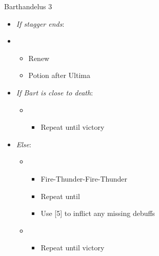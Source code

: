 \begin{battle}{Barthandelus 3}
\begin{multicols}{2}
\begin{itemize}
            \columnbreak
      \item \textit{If stagger ends}:
      \item \third
            \begin{itemize}
              \item Renew
              \item Potion after Ultima
            \end{itemize}
      \item \textit{If Bart is close to death}:
            \begin{itemize}
              \item \first
                    \begin{itemize}
                      \item Repeat until victory
                    \end{itemize}
            \end{itemize}
      \item \textit{Else}:
            \begin{itemize}
              \item \sixth
                    \begin{itemize}
                      \item Fire-Thunder-Fire-Thunder
                      \item Repeat until \stagger
                      \item Use [5] to inflict any missing debuffs
                    \end{itemize}
              \item \first
                    \begin{itemize}
                      \item Repeat until victory
                    \end{itemize}
            \end{itemize}
    \end{itemize}
  \end{multicols}
\end{battle}
